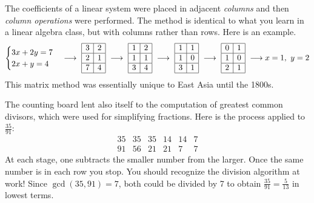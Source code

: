 The coefficients of a linear system were placed in adjacent \emph{columns} and then \emph{column operations} were performed. The method is identical to what you learn in a linear algebra class, but with columns rather than rows. Here is an example.
\[
	\begin{cases}
		3x+2y=7\\
		2x+y=4
	\end{cases}
	\longrightarrow\ 
	\begin{array}{|c|c|c|c|c|}
	  \hline
	  3&2\\\hline
	  2&1\\\hline
	  7&4\\\hline
  \end{array}
  \ \longrightarrow\ 
	\begin{array}{|c|c|c|c|c|}
	  \hline
	  1&2\\\hline
	  1&1\\\hline
	  3&4\\\hline
  \end{array}
  \ \longrightarrow\ 
	\begin{array}{|c|c|c|c|c|}
	  \hline
	  1&1\\\hline
	  1&0\\\hline
	  3&1\\\hline
  \end{array}
  \ \longrightarrow\ 
	\begin{array}{|c|c|c|c|c|}
	  \hline
	  0&1\\\hline
	  1&0\\\hline
	  2&1\\\hline
  \end{array}
  \ \longrightarrow x=1,\ y=2
\]
This matrix method was essentially unique to East Asia until the 1800s.



The counting board lent also itself to the computation of greatest common divisors, which were used for simplifying fractions. Here is the process applied to $\frac{35}{91}$:
\[
	\begin{array}{llllllll}
		35&35&35&14&14&7\\
		91&56&21&21&7&7
	\end{array}
\]
At each stage, one subtracts the smaller number from the larger. Once the same number is in each row you stop. You should recognize the division algorithm at work! Since $\gcd(35,91)=7$, both could be divided by 7 to obtain $\frac{35}{91}=\frac 5{13}$ in lowest terms.


